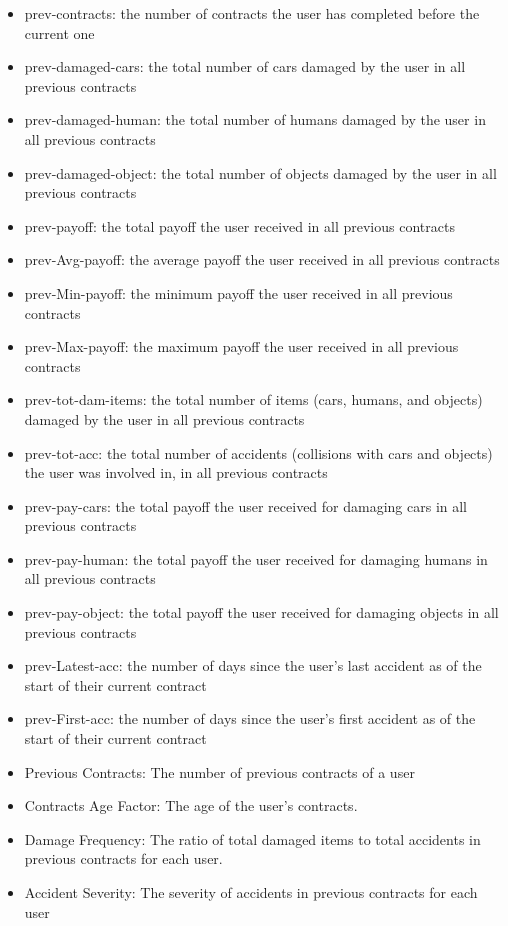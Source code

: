 \documentclass{IEEEtran}
\begin{document}
\begin{itemize}
\item prev-contracts: the number of contracts the user has completed before the current one
\item prev-damaged-cars: the total number of cars damaged by the user in all previous contracts
\item prev-damaged-human: the total number of humans damaged by the user in all previous contracts
\item prev-damaged-object: the total number of objects damaged by the user in all previous contracts
\item prev-payoff: the total payoff the user received in all previous contracts
\item prev-Avg-payoff: the average payoff the user received in all previous contracts
\item prev-Min-payoff: the minimum payoff the user received in all previous contracts
\item prev-Max-payoff: the maximum payoff the user received in all previous contracts
\item prev-tot-dam-items: the total number of items (cars, humans, and objects) damaged by the user in all previous contracts
\item prev-tot-acc: the total number of accidents (collisions with cars and objects) the user was involved in, in all previous contracts
\item prev-pay-cars: the total payoff the user received for damaging cars in all previous contracts
\item prev-pay-human: the total payoff the user received for damaging humans in all previous contracts
\item prev-pay-object: the total payoff the user received for damaging objects in all previous contracts
\item prev-Latest-acc: the number of days since the user's last accident as of the start of their current contract
\item prev-First-acc: the number of days since the user's first accident as of the start of their current contract
\item Previous Contracts: The number of previous contracts of a user
\item Contracts Age Factor: The age of the user's contracts.
\item Damage Frequency: The ratio of total damaged items to total accidents in previous contracts for each user.
\item Accident Severity: The severity of accidents in previous contracts for each user

\end{itemize}
\end{document}
